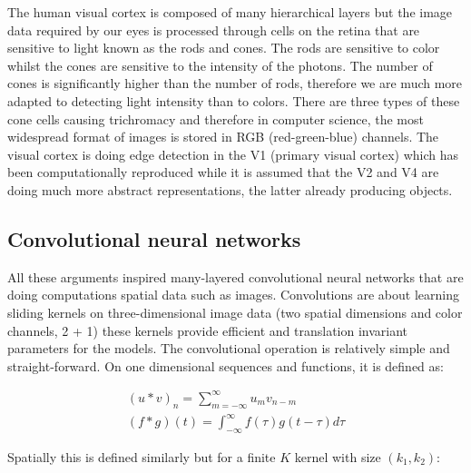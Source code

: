 \documentclass[a4paper,12pt]{article}
\begin{document}
\vspace{7mm}

\par The human visual cortex is composed of many hierarchical layers but the image data required by our eyes is processed through cells on the retina that are sensitive to light known as the rods and cones. The rods are sensitive to color whilst the cones are sensitive to the intensity of the photons. The number of cones is significantly higher than the number of rods, therefore we are much more adapted to detecting light intensity than to colors. There are three types of these cone cells causing trichromacy \cite{arrese2002trichromacy} and therefore in computer science, the most widespread format of images is stored in RGB (red-green-blue) channels. The visual cortex is doing edge detection in the V1 (primary visual cortex) which has been computationally reproduced \cite{olshausen1996emergence} while it is assumed that the V2 \cite{ZiembaV2} and V4 are doing much more abstract representations, the latter already producing objects.

\vspace{7mm}

\subsection{Convolutional neural networks}

\vspace{7mm}

\par All these arguments inspired many-layered convolutional neural networks that are doing computations spatial data such as images. Convolutions are about learning sliding kernels on three-dimensional image data (two spatial dimensions and color channels, 2 + 1) these kernels provide efficient and translation invariant parameters for the models. The convolutional operation is relatively simple and straight-forward. On one dimensional sequences and functions, it is defined as:

\begin{align*}
    (u * v)_n = \sum_{m = -\infty}^{\infty} u_{m} v_{n-m} \\
    (f * g)(t) = \int_{-\infty}^{\infty} f(\tau)g(t-\tau)d\tau
\end{align*}

\vspace{4mm}

\par Spatially this is defined similarly but for a finite $K$ kernel with size $(k_1, k_2)$:
\end{document}

